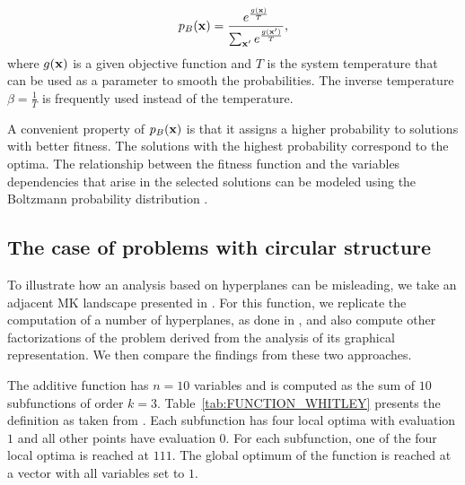 \documentclass{article} %
\begin{document}
  \begin{equation}
  p_B({\bf{x}}) = \frac{e^{\frac{g({\bf{x}})}{T}}}{
  \sum_{{\bf{x}}'} e^{\frac{g({\bf{x}}')}{T}}}, \label{eq:BOLTPROB}
  \end{equation}
  where $g({\bf{x}})$ is a given objective function and $T$ is the system temperature that can be used as a parameter to smooth the probabilities. The inverse temperature  $\beta = \frac{1}{T}$ is frequently used instead of the temperature. 

A convenient property of $p_B({\bf{x}})$ is that it assigns a higher probability to solutions with better fitness. The solutions with the highest probability correspond to the optima.  The relationship between the fitness function and the variables dependencies that arise in the selected solutions can be modeled using the Boltzmann probability distribution  \cite{Hoens:2005,Mahnig:2001b,Muehlenbein_and_Mahnig:2002a,Muhlenbein_et_al:1999}. 

\subsection{The case of problems with circular structure}

 To illustrate how an analysis based on hyperplanes can be misleading, we take an adjacent MK landscape presented in \cite{Whitley:2015,Whitley_et_al:2016}. For this function, we replicate the computation of a number of hyperplanes, as done in  \cite{Whitley:2015,Whitley_et_al:2016}, and also compute other factorizations of the problem derived from the analysis of its graphical representation. We then compare the findings from these two approaches.

 The additive function has  $n=10$ variables and is computed as the sum of $10$ subfunctions of order $k=3$.  Table~\ref{tab:FUNCTION_WHITLEY} presents the definition as taken from \cite{Whitley:2015}. Each subfunction has four local optima with evaluation $1$ and all other points have evaluation $0$. For each subfunction, one of the four local optima is reached at $111$. The global optimum of the function is reached at a vector with all variables set to $1$. 
\end{document}

